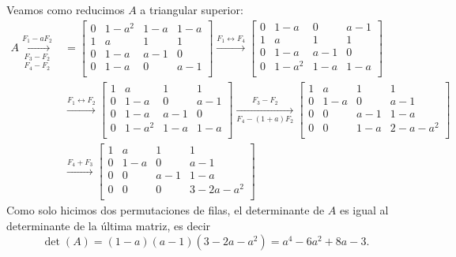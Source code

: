 \begin{enumerate}[topsep=6pt,itemsep=.4cm]
            Veamos como reducimos $A$ a triangular superior:
            \begin{align*}
                A \underset{F_4 -F_2}{\underset{F_3 -F_2}{\stackrel{F_1-aF_2}{\longrightarrow}}} &=  \begin{bmatrix}
                    0&1-a^2&1-a&1-a \\ 
                    1&a&1&1 \\
                    0&1-a&a-1&0 \\
                    0&1-a&0&a-1 \\
                \end{bmatrix}
                {\stackrel{F_1 \leftrightarrow F_4}{\longrightarrow}} 
                \begin{bmatrix}
                    0&1-a&0&a-1 \\
                    1&a&1&1 \\
                    0&1-a&a-1&0 \\
                    0&1-a^2&1-a&1-a \\ 
                \end{bmatrix} \\
                &{\stackrel{F_1 \leftrightarrow F_2}{\longrightarrow}}
                \begin{bmatrix}
                    1&a&1&1 \\
                    0&1-a&0&a-1 \\
                    0&1-a&a-1&0 \\
                    0&1-a^2&1-a&1-a \\ 
                \end{bmatrix} 
                {\underset{F_4 -(1+a)F_2}{\stackrel{F_3-F_2}{\longrightarrow}}}
                \begin{bmatrix}
                    1&a&1&1 \\
                    0&1-a&0&a-1 \\
                    0&0&a-1&1-a \\
                    0&0&1-a&2-a-a^2 \\ 
                \end{bmatrix}  \\
                &\stackrel{F_4 + F_3}{\longrightarrow}
                \begin{bmatrix}
                    1&a&1&1 \\
                    0&1-a&0&a-1 \\
                    0&0&a-1&1-a \\
                    0&0&0&3-2a-a^2 \\ 
                \end{bmatrix} 
            \end{align*}
        Como solo hicimos dos permutaciones de filas, el determinante de  $A$ es igual al determinante de la última matriz,  es decir
        $$
        \det(A) = (1-a)(a-1)(3-2a-a^2) = a^4 - 6 a^2 + 8 a - 3.
        $$
        

\end{enumerate}
